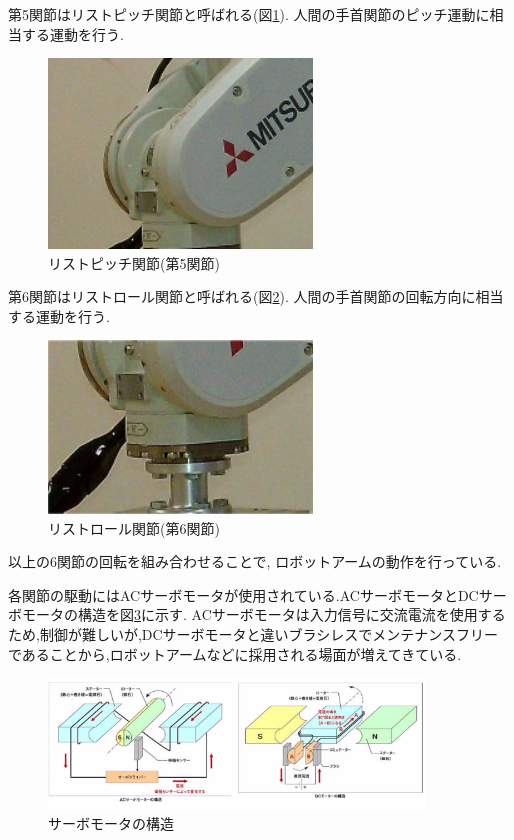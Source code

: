 \documentclass[a4paper,11pt]{jsarticle}
\begin{document}
第5関節はリストピッチ関節と呼ばれる(図\ref{リストピッチ関節}). 人間の手首関節のピッチ運動に相当する運動を行う.
\begin{figure}[H]
  \begin{center}
    \includegraphics[width = 7cm]{画像/リストピッチ関節.png}
    \caption{リストピッチ関節(第5関節)}
    \label{リストピッチ関節}
  \end{center}
\end{figure}

第6関節はリストロール関節と呼ばれる(図\ref{リストロール関節}). 人間の手首関節の回転方向に相当する運動を行う.
\begin{figure}[H]
  \begin{center}
    \includegraphics[width = 7cm]{画像/リストロール関節.png}
    \caption{リストロール関節(第6関節)}
    \label{リストロール関節}
  \end{center}
\end{figure}

以上の6関節の回転を組み合わせることで, ロボットアームの動作を行っている.
\par
各関節の駆動にはACサーボモータが使用されている.ACサーボモータとDCサーボモータの構造を図\ref{サーボモータの構造}に示す.
ACサーボモータは入力信号に交流電流を使用するため,制御が難しいが,DCサーボモータと違いブラシレスでメンテナンスフリー
であることから,ロボットアームなどに採用される場面が増えてきている.
\begin{figure}[H]
  \begin{center}
    \includegraphics[width = 10cm]{画像/サーボモータの構造.png}
    \caption{サーボモータの構造}
    \label{サーボモータの構造}
  \end{center}
\end{figure}
\end{document}
